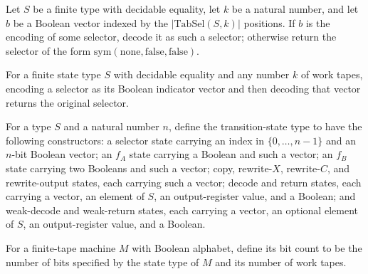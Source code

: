 \begin{definition}
\label{Complexity.Meyer.decodeSel}
\leanok
{}
Let $S$ be a finite type with decidable equality, let $k$ be a natural number, and let
$b$ be a Boolean vector indexed by the $|\mathrm{TabSel}(S,k)|$ positions. If $b$ is the
encoding of some selector, decode it as such a selector; otherwise return the selector
of the form $\mathrm{sym}(\mathrm{none},\mathrm{false},\mathrm{false})$.
\end{definition}

\begin{theorem}
\label{Complexity.Meyer.decodeSel_encodeSel}
\leanok
{}
For a finite state type $S$ with decidable equality and any number $k$ of work tapes,
encoding a selector as its Boolean indicator vector and then decoding that vector
returns the original selector.
\end{theorem}

\begin{definition}
\label{Complexity.Meyer.TState}
\leanok
{}
For a type $S$ and a natural number $n$, define the transition-state type to have the
following constructors: a selector state carrying an index in $\{0,\ldots,n-1\}$ and an
$n$-bit Boolean vector; an $f_A$ state carrying a Boolean and such a vector; an $f_B$
state carrying two Booleans and such a vector; copy, rewrite-$X$, rewrite-$C$, and
rewrite-output states, each carrying such a vector; decode and return states, each
carrying a vector, an element of $S$, an output-register value, and a Boolean; and
weak-decode and weak-return states, each carrying a vector, an optional element of $S$,
an output-register value, and a Boolean.
\end{definition}

\begin{definition}
\label{Complexity.Meyer.nbits}
\leanok
{}
For a finite-tape machine $M$ with Boolean alphabet, define its bit count to be the
number of bits specified by the state type of $M$ and its number of work tapes.
\end{definition}

